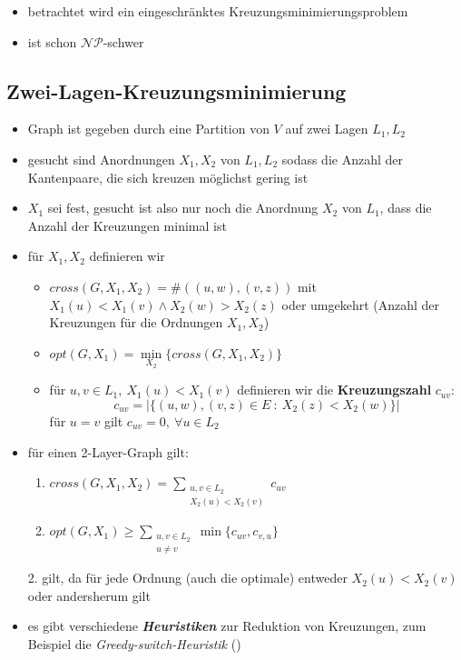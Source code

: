 \vspace*{-0.5\baselineskip}
\begin{itemize}[itemsep=-1pt]
	\item betrachtet wird ein eingeschränktes Kreuzungsminimierungsproblem
	\item ist schon $\mathcal{NP}$-schwer
\end{itemize}
\subsection{Zwei-Lagen-Kreuzungsminimierung}
\begin{itemize}[itemsep=-1pt]
	\item Graph ist gegeben durch eine Partition von $V$ auf zwei Lagen $L_1,L_2$
	\item gesucht sind Anordnungen $X_1,X_2$ von $L_1,L_2$ sodass die Anzahl der Kantenpaare, die sich kreuzen möglichst gering ist
	\item $X_1$ sei fest, gesucht ist also nur noch die Anordnung $X_2$ von $L_1$, dass die Anzahl der Kreuzungen minimal ist
	\item für $X_1,X_2$ definieren wir
		\begin{itemize}
			\item $cross(G,X_1,X_2)=\# ((u,w),(v,z))$ mit $X_1(u)<X_1(v) \wedge X_2(w)>X_2(z)$ oder umgekehrt (Anzahl der Kreuzungen für die Ordnungen $X_1,X_2$)
			\item $opt(G,X_1)=\min\limits_{X_2}\{cross(G,X_1,X_2)\}$
			\item für $u,v\in L_1,~X_1(u)<X_1(v)$ definieren wir die \textbf{Kreuzungszahl} $c_{uv}$:
				\[c_{uv}=|\{(u,w),(v,z)\in E~:~X_2(z)<X_2(w)\}|\]
				für $u=v$ gilt $c_{uv}=0,~\forall u\in L_2$
		\end{itemize}
	\item für einen 2-Layer-Graph gilt:
		\begin{enumerate}[itemsep=-1pt]
			\item $cross(G,X_1,X_2)=\sum\limits_{\substack{u,v\in L_2\\X_2(u)<X_2(v)}} c_{uv}$
			\item $opt(G,X_1)\geq \sum\limits_{\substack{u,v\in L_2\\u\neq v}}\min\{c_{uv},c_{v,u}\}$
		\end{enumerate}
		2. gilt, da für jede Ordnung (auch die optimale) entweder $X_2(u)<X_2(v)$ oder andersherum gilt
	\item es gibt verschiedene \textit{\textbf{Heuristiken}} zur Reduktion von Kreuzungen, zum Beispiel die \textit{Greedy-switch-Heuristik} ()
\end{itemize}
